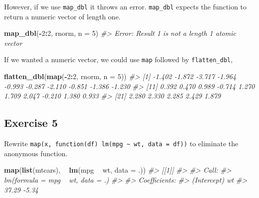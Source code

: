 \documentclass[]{book}
\newenvironment{Shaded}{\begin{snugshade}}{\end{snugshade}}
\newcommand{\CommentTok}[1]{\textcolor[rgb]{0.56,0.35,0.01}{\textit{#1}}}
\newcommand{\DataTypeTok}[1]{\textcolor[rgb]{0.13,0.29,0.53}{#1}}
\newcommand{\DecValTok}[1]{\textcolor[rgb]{0.00,0.00,0.81}{#1}}
\newcommand{\KeywordTok}[1]{\textcolor[rgb]{0.13,0.29,0.53}{\textbf{#1}}}
\newcommand{\NormalTok}[1]{#1}
\newcommand{\OperatorTok}[1]{\textcolor[rgb]{0.81,0.36,0.00}{\textbf{#1}}}
\newcommand{\StringTok}[1]{\textcolor[rgb]{0.31,0.60,0.02}{#1}}
\theoremstyle{plain}
\theoremstyle{remark}
\theoremstyle{definition}
\theoremstyle{definition}
\theoremstyle{definition}
\theoremstyle{remark}
\begin{document}
However, if we use \texttt{map\_dbl} it throws an error.
\texttt{map\_dbl} expects the function to return a numeric vector of
length one.

\begin{Shaded}
\begin{Highlighting}[]
\KeywordTok{map_dbl}\NormalTok{(}\OperatorTok{-}\DecValTok{2}\OperatorTok{:}\DecValTok{2}\NormalTok{, rnorm, }\DataTypeTok{n =} \DecValTok{5}\NormalTok{)}
\CommentTok{#> Error: Result 1 is not a length 1 atomic vector}
\end{Highlighting}
\end{Shaded}

If we wanted a numeric vector, we could use \texttt{map} followed by
\texttt{flatten\_dbl},

\begin{Shaded}
\begin{Highlighting}[]
\KeywordTok{flatten_dbl}\NormalTok{(}\KeywordTok{map}\NormalTok{(}\OperatorTok{-}\DecValTok{2}\OperatorTok{:}\DecValTok{2}\NormalTok{, rnorm, }\DataTypeTok{n =} \DecValTok{5}\NormalTok{))}
\CommentTok{#>  [1] -1.402 -1.872 -3.717 -1.964 -0.993 -0.287 -2.110 -0.851 -1.386 -1.230}
\CommentTok{#> [11]  0.392  0.470  0.989 -0.714  1.270  1.709  2.047 -0.210  1.380  0.933}
\CommentTok{#> [21]  2.280  2.330  2.285  2.429  1.879}
\end{Highlighting}
\end{Shaded}

\hypertarget{exercise-5-20}{%
\subsection{Exercise 5}\label{exercise-5-20}}

Rewrite
\texttt{map(x,\ function(df)\ lm(mpg\ \textasciitilde{}\ wt,\ data\ =\ df))}
to eliminate the anonymous function.

\begin{Shaded}
\begin{Highlighting}[]
\KeywordTok{map}\NormalTok{(}\KeywordTok{list}\NormalTok{(mtcars), }\OperatorTok{~}\StringTok{ }\KeywordTok{lm}\NormalTok{(mpg }\OperatorTok{~}\StringTok{ }\NormalTok{wt, }\DataTypeTok{data =}\NormalTok{ .))}
\CommentTok{#> [[1]]}
\CommentTok{#> }
\CommentTok{#> Call:}
\CommentTok{#> lm(formula = mpg ~ wt, data = .)}
\CommentTok{#> }
\CommentTok{#> Coefficients:}
\CommentTok{#> (Intercept)           wt  }
\CommentTok{#>       37.29        -5.34}
\end{Highlighting}
\end{Shaded}
\end{document}
